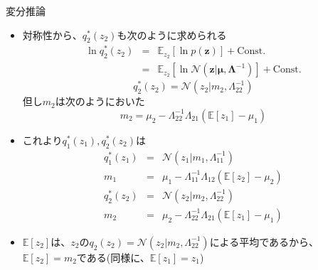 \documentclass[dvipdfmx,notheorems,t]{beamer}
\begin{document}
\begin{frame}{変分推論}
\begin{itemize}
\begin{itemize}
		\item 対称性から、$q_2^*(z_2)$も次のように求められる
		\begin{eqnarray}
			\ln q_2^*(z_2) &=& \mathbb{E}_{z_2}[\ln p(\bm{z})] + \mathrm{Const.} \\
			&=& \mathbb{E}_{z_2}[\ln \mathcal{N}(\bm{z} | \bm{\mu}, \bm{\Lambda}^{-1})] + \mathrm{Const.}
		\end{eqnarray}
		\begin{equation}
			q_2^*(z_2) = \mathcal{N}(z_2 | m_2, \Lambda_{22}^{-1})
		\end{equation}
		但し$m_2$は次のようにおいた
		\begin{equation}
			m_2 = \mu_2 - \Lambda_{22}^{-1} \Lambda_{21} (\mathbb{E}[z_1] - \mu_1)
		\end{equation}
		
		\item これより$q_1^*(z_1), q_2^*(z_2)$は
		\begin{eqnarray}
			q_1^*(z_1) &=& \mathcal{N}(z_1 | m_1, \Lambda_{11}^{-1}) \\
			m_1 &=& \mu_1 - \Lambda_{11}^{-1} \Lambda_{12} (\mathbb{E}[z_2] - \mu_2) \\
			q_2^*(z_2) &=& \mathcal{N}(z_2 | m_2, \Lambda_{22}^{-1}) \\
			m_2 &=& \mu_2 - \Lambda_{22}^{-1} \Lambda_{21} (\mathbb{E}[z_1] - \mu_1)
		\end{eqnarray}
		
		\item $\mathbb{E}[z_2]$は、$z_2$の$q_2(z_2) = \mathcal{N}(z_2 | m_2, \Lambda_{22}^{-1})$による平均であるから、$\mathbb{E}[z_2] = m_2$である(同様に、$\mathbb{E}[z_1] = z_1$)
		\newline
		

\end{itemize}
\end{itemize}
\end{frame}
\end{document}
